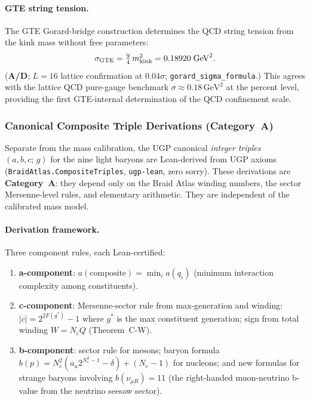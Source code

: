 \documentclass[11pt]{article}
\theoremstyle{remark}
\newcommand{\CatAD}{\textbf{A/D}}
\begin{document}
\paragraph{GTE string tension.}
The GTE Gorard-bridge construction determines the QCD string tension from the kink mass without free parameters:
\begin{equation}
\sigma_{\rm GTE} = \tfrac{9}{4}\,m_{\rm kink}^2 = 0.18920\;\text{GeV}^2.
\end{equation}
(\CatAD; $L=16$ lattice confirmation at $0.04\sigma$; \texttt{gorard\allowbreak\_sigma\allowbreak\_formula}.)
This agrees with the lattice QCD pure-gauge benchmark $\sigma \approx 0.18\,\text{GeV}^2$ at the percent level, providing the first GTE-internal determination of the QCD confinement scale.

\subsubsection{Canonical Composite Triple Derivations (Category~A)}
\label{subsec:composite_triples}

Separate from the mass calibration, the UGP canonical \emph{integer triples}
$(a,b,c;\,g)$ for the nine light baryons are Lean-derived from UGP axioms
(\texttt{BraidAtlas.CompositeTriples}, \texttt{ugp-lean}, zero sorry).
These derivations are \textbf{Category~A}: they depend only on the Braid Atlas
winding numbers, the sector Mersenne-level rules, and elementary arithmetic.
They are independent of the calibrated mass model.

\paragraph{Derivation framework.}
Three component rules, each Lean-certified:
\begin{enumerate}[leftmargin=2em]
  \item \textbf{a-component}: $a(\text{composite}) = \min_i a(q_i)$ (minimum
    interaction complexity among constituents).
  \item \textbf{c-component}: Mersenne-sector rule from max-generation and winding:
    $|c| = 2^{2F(g^*)}-1$ where $g^*$ is the max constituent generation;
    sign from total winding $W = N_c Q$ (Theorem~C-W).
  \item \textbf{b-component}: sector rule for mesons; baryon formula
    $b(p) = N_c^2(a_u 2^{N_c^2-1}-\delta)+(N_c-1)$ for nucleons; and
    new formulas for strange baryons involving $b(\nu_{\mu R})=11$
    (the right-handed muon-neutrino b-value from the neutrino seesaw sector).
\end{enumerate}
\end{document}
